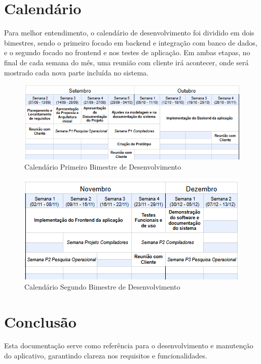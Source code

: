 \documentclass[12pt,a4paper]{report}
\begin{document}
\chapter{Calendário}
\label{sec:Calendario}

Para melhor entendimento, o calendário de desenvolvimento foi dividido em dois bimestres, sendo o primeiro focado em backend e integração com banco de dados, e o segundo focado no frontend e nos testes de aplicação. Em ambas etapas, no final de cada semana do mês, uma reunião com cliente irá acontecer, onde será mostrado cada nova parte incluída no sistema.  

\vspace{2cm}

\begin{figure}[h!]
\centering
\includegraphics[width = \linewidth]{imagens/Calendario1bi.png}
\caption{Calendário Primeiro Bimestre de Desenvolvimento}
\label{Calendário Primeiro Bimestre de Desenvolvimento}
\end{figure}

\begin{figure}[h!]
\centering
\includegraphics[width = \linewidth]{imagens/Calendario2bi.png}
\caption{Calendário Segundo Bimestre de Desenvolvimento}
\label{Calendário Segundo Bimestre de Desenvolvimento}
\end{figure}

\chapter{Conclusão}
Esta documentação serve como referência para o desenvolvimento e manutenção do aplicativo, garantindo clareza nos requisitos e funcionalidades.
\end{document}
